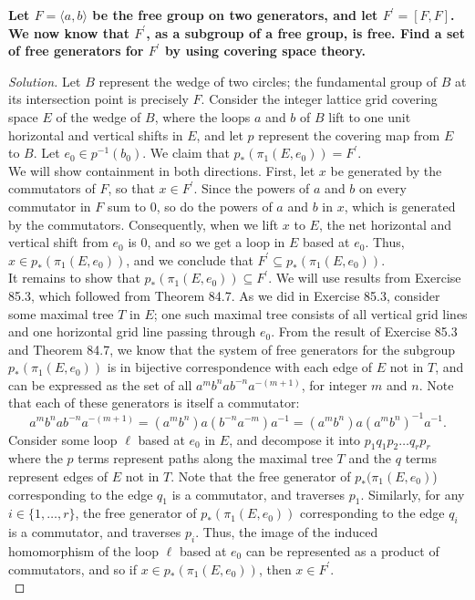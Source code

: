 \documentclass[11pt]{article}
\newenvironment{solution}
  {\renewcommand\qedsymbol{$\blacksquare$}\begin{proof}[Solution]}
  {\end{proof}}
\begin{document}
\newpage

\textbf{Let $F = \langle a, b\rangle$ be the free group on two generators, and let $F^{\prime} = [F, F]$. We now know that $F^{\prime}$, as a subgroup of a free group, is free.
Find a set of free generators for $F^{\prime}$ by using covering space theory.}

\begin{solution}
Let $B$ represent the wedge of two circles; the fundamental group of $B$ at its intersection point is precisely $F$. 
Consider the integer lattice grid covering space $E$ of the wedge of $B$, where the loops $a$ and $b$ of $B$
lift to one unit horizontal and vertical shifts in $E$, and let $p$ represent the covering map from $E$ to $B$. Let $e_0 \in p^{-1}(b_0)$. 
We claim that $p_{\ast}(\pi_1(E, e_0)) = F^{\prime}$. \\

We will show containment in both directions. First, let $x$ be generated by the commutators of $F$, so that $x \in F^{\prime}$.
Since the powers of $a$ and $b$ on every commutator in $F$ sum to $0$, so do the powers of $a$ and $b$ in $x$, which is generated by the commutators. Consequently, when we
lift $x$ to $E$, the net horizontal and vertical shift from $e_0$ is $0$, and so we get a loop in $E$ based at $e_0$. Thus, $x \in p_{\ast}(\pi_1(E, e_0))$,
and we conclude that $F^{\prime} \subseteq p_{\ast}(\pi_1(E, e_0))$. \\

It remains to show that $p_{\ast}(\pi_1(E, e_0)) \subseteq F^{\prime}$. 
We will use results from Exercise 85.3, which followed from Theorem 84.7. As we did in Exercise 85.3, consider some maximal tree $T$
in $E$; one such maximal tree consists of all vertical grid lines and one horizontal grid line passing through $e_0$. From the result
of Exercise 85.3 and Theorem 84.7, we know that the system of free generators for the subgroup $p_{\ast}(\pi_1(E, e_0))$ 
is in bijective correspondence with each edge of $E$ not in $T$, and can be expressed as the set of all $a^m b^n a b^{-n} a^{-(m+1)}$, for integer $m$ and $n$. 
Note that each of these generators is itself a commutator:
\[
    a^m b^n a b^{-n} a^{-(m+1)} = (a^m b^n) a (b^{-n} a^{-m}) a^{-1} = (a^m b^n) a (a^m b^n)^{-1} a^{-1}.
\]
Consider some loop $\ell$ based at $e_0$ in $E$, and decompose it into $p_1 q_1 p_2 \dots q_r p_r$ where the $p$ terms represent
paths along the maximal tree $T$ and the $q$ terms represent edges of $E$ not in $T$. Note that the free generator of $p_{\ast}(\pi_1(E, e_0)$) corresponding to
the edge $q_1$ is a commutator, and traverses $p_1$. Similarly, for any $i \in \{ 1, \dots, r \}$, the free generator of $p_{\ast}(\pi_1(E, e_0))$ corresponding to
the edge $q_i$ is a commutator, and traverses $p_i$. Thus, the image of the induced homomorphism of the loop $\ell$ based at $e_0$ can be represented as a product
of commutators, and so if $x \in p_{\ast}(\pi_1(E, e_0))$, then $x \in F^{\prime}$. \\


\end{solution}
\end{document}
